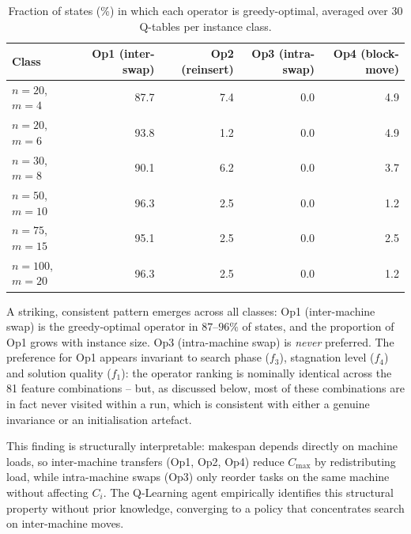 \documentclass[final,3p,times,11pt,authoryear]{elsarticle}
\begin{document}
\begin{table}[ht]
\centering
\caption{Fraction of states (\%) in which each operator is
         greedy-optimal, averaged over 30 Q-tables per instance
         class.}
\label{tab:policy}
\renewcommand{\arraystretch}{1.15}
{\footnotesize
\begin{tabular}{@{}lrrrr@{}}
\toprule
Class & Op1 (inter-swap) & Op2 (reinsert) & Op3 (intra-swap) & Op4 (block-move) \\
\midrule
$n{=}20$, $m{=}4$   & 87.7 & 7.4 & 0.0 & 4.9 \\
$n{=}20$, $m{=}6$   & 93.8 & 1.2 & 0.0 & 4.9 \\
$n{=}30$, $m{=}8$   & 90.1 & 6.2 & 0.0 & 3.7 \\
$n{=}50$, $m{=}10$  & 96.3 & 2.5 & 0.0 & 1.2 \\
$n{=}75$, $m{=}15$  & 95.1 & 2.5 & 0.0 & 2.5 \\
$n{=}100$, $m{=}20$ & 96.3 & 2.5 & 0.0 & 1.2 \\
\bottomrule
\end{tabular}}
\end{table}

A striking, consistent pattern emerges across all classes: Op1
(inter-machine swap) is the greedy-optimal operator in $87$--$96\%$
of states, and the proportion of Op1 grows with instance size. Op3
(intra-machine swap) is \emph{never} preferred. The preference for
Op1 appears invariant to search phase ($f_3$), stagnation level
($f_4$) and solution quality ($f_1$): the operator ranking is
nominally identical across the 81 feature combinations -- but, as
discussed below, most of these combinations are in fact never
visited within a run, which is consistent with either a genuine
invariance or an initialisation artefact.

This finding is structurally interpretable: makespan depends directly
on machine loads, so inter-machine transfers (Op1, Op2, Op4) reduce
$C_{\max}$ by redistributing load, while intra-machine swaps (Op3)
only reorder tasks on the same machine without affecting $C_i$. The
Q-Learning agent empirically identifies this structural property
without prior knowledge, converging to a policy that concentrates
search on inter-machine moves.
\end{document}
